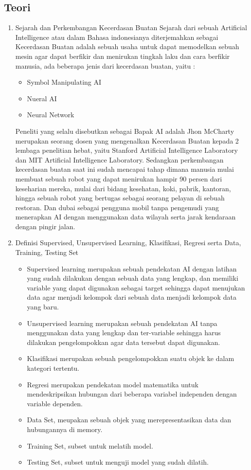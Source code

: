 \subsection{Teori}
\begin{enumerate}
\item
Sejarah dan Perkembangan Kecerdasan Buatan
\subitem
Sejarah dari sebuah Artificial Intelligence atau dalam Bahasa indonesianya diterjemahkan sebagai Kecerdasan Buatan adalah sebuah usaha untuk dapat memodelkan sebuah mesin agar dapat berfikir dan menirukan tingkah laku dan cara berfikir manusia, ada beberapa jenis dari kecerdasan buatan, yaitu :

\begin{itemize}
\item
Symbol Manipulating AI
\item
Nueral AI
\item
Neural Network
\end{itemize}
\subitem
Peneliti yang selalu disebutkan sebagai Bapak AI adalah Jhon McCharty  merupakan seorang dosen yang mengenalkan Kecerdasan Buatan kepada 2 lembaga penelitian hebat, yaitu Stanford Artificial Intelligence Laboratory dan MIT Artificial Intelligence Laboratory.
\subitem
Sedangkan perkembangan kecerdasan buatan saat ini sudah mencapai tahap dimana manusia mulai membuat sebuah robot yang dapat menirukan hampir 90 persen dari keseharian mereka, mulai dari bidang kesehatan, koki, pabrik, kantoran, hingga sebuah robot yang bertugas sebagai seorang pelayan di sebuah restoran. Dan dubai sebagai pengguna mobil tanpa pengemudi yang menerapkan AI dengan menggunakan data wilayah serta jarak kendaraan dengan pingir jalan.
\item
Definisi Supervised, Unsupervised Learning, Klasifikasi, Regresi serta Data, Training, Testing Set
\begin{itemize}
\item
Supervised learning merupakan sebuah pendekatan AI dengan latihan yang sudah dilakukan dengan sebuah data yang lengkap, dan memiliki variable yang dapat digunakan sebagai target sehingga dapat menujukan data agar menjadi kelompok dari sebuah data menjadi kelompok data yang baru.
\item
Unsupervised learning merupakan sebuah pendekatan AI tanpa menggunakan data yang lengkap dan ter-variable sehingga harus dilakukan pengelompokkan agar data tersebut dapat digunakan.
\item
Klasifikasi merupakan sebuah pengelompokkan suatu objek ke dalam kategori tertentu.
\item
Regresi merupakan pendekatan model matematika untuk mendeskripsikan hubungan dari beberapa variabel independen dengan variable dependen.
\item
Data Set, meupakan sebuah objek yang merepresentasikan data dan hubungannya di memory. 
\item
Training Set, subset untuk melatih model.
\item
Testing Set, subset untuk menguji model yang sudah dilatih.
\end{itemize}


\end{enumerate}
